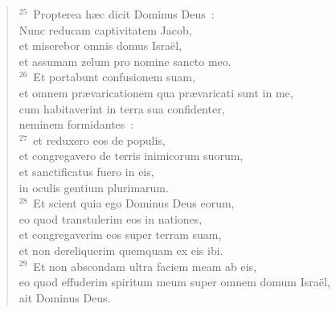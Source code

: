 \begin{flushleft}\begin{verse}${}^{25}$~Propterea h\ae c dicit Dominus Deus~:\\ Nunc reducam captivitatem Jacob,\\ et miserebor omnis domus Isra\"el,\\ et assumam zelum pro nomine sancto meo.\\
${}^{26}$~Et portabunt confusionem suam,\\ et omnem pr\ae varicationem qua pr\ae varicati sunt in me,\\ cum habitaverint in terra sua confidenter,\\ neminem formidantes~:\\
${}^{27}$~et reduxero eos de populis,\\ et congregavero de terris inimicorum suorum,\\ et sanctificatus fuero in eis,\\ in oculis gentium plurimarum.\\
${}^{28}$~Et scient quia ego Dominus Deus eorum,\\ eo quod transtulerim eos in nationes,\\ et congregaverim eos super terram suam,\\ et non dereliquerim quemquam ex eis ibi.\\
${}^{29}$~Et non abscondam ultra faciem meam ab eis,\\ eo quod effuderim spiritum meum super omnem domum Isra\"el,\\ ait Dominus Deus.\end{verse}\end{flushleft}


